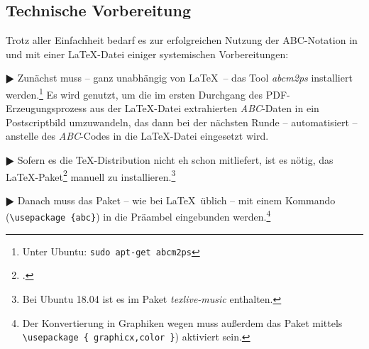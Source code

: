 \subsection{Technische Vorbereitung}

Trotz aller Einfachheit bedarf es zur erfolgreichen Nutzung der ABC-Notation
in und mit einer \LaTeX-Datei einiger systemischen Vorbereitungen:

$\RHD$ Zunächst muss -- ganz unabhängig von \LaTeX\ -- das Tool \textit{abcm2ps}
installiert werden.\footnote{Unter Ubuntu: \texttt{sudo apt-get abcm2ps}} Es
wird genutzt, um die im  ersten Durchgang des PDF-Erzeugungsprozess aus der
\LaTeX-Datei extrahierten \textit{ABC}-Daten in ein Postscriptbild
umzuwandeln, das dann bei der nächsten Runde -- automatisiert -- anstelle des
\textit{ABC}-Codes in die \LaTeX-Datei eingesetzt wird.
  
$\RHD$ Sofern es die \TeX-Distribution nicht eh schon mitliefert, ist es nötig,
das \LaTeX-Paket\footcite[vgl.][\nopage wp.]{CtanAbc2018a} manuell zu
installieren.\footnote{Bei Ubuntu 18.04 ist es im Paket \textit{texlive-music}
enthalten.}
  
$\RHD$ Danach muss das Paket -- wie bei \LaTeX\ üblich -- mit einem Kommando
(\texttt{\textbackslash{usepackage} \{abc\}}) in die Präambel eingebunden
werden.\footnote{Der Konvertierung in Graphiken wegen muss außerdem das Paket
 mittels \texttt{\textbackslash{usepackage} \{ graphicx,color \}})
aktiviert sein.}
  
